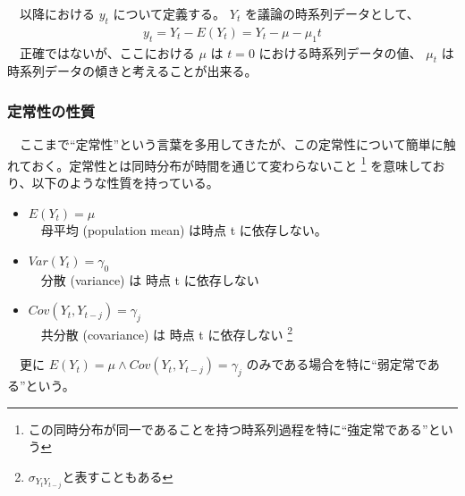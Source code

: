 \documentclass{scrartcl}
\begin{document}
　以降における \(y_t\) について定義する。 \(Y_t\) を議論の時系列データとして、\\
\begin{align}
y_t = Y_t - E(Y_t) = Y_t - \mu - \mu_1 t
\end{align}
　正確ではないが、ここにおける \(\mu\) は \(t = 0\) における時系列データの値、 \(\mu_t\) は 時系列データの傾きと考えることが出来る。\\

\subsubsection{定常性の性質}
\label{sec:org434eb10}
　ここまで``定常性''という言葉を多用してきたが、この定常性について簡単に触れておく。定常性とは同時分布が時間を通じて変わらないこと \footnote{この同時分布が同一であることを持つ時系列過程を特に``強定常である''という} を意味しており、以下のような性質を持っている。\\

\begin{itemize}
\item \(E(Y_t) = \mu\) \\
　母平均 (population mean) は時点 t に依存しない。\\
\item \(Var(Y_t) = \gamma_0\) \\
　分散 (variance) は 時点 t に依存しない\\
\item \(Cov(Y_t, Y_{t-j}) = \gamma_j\) \\
　共分散 (covariance) は 時点 t に依存しない \footnote{$\sigma_{Y_t Y_{t-j}}$と表すこともある}
\end{itemize}

　更に \(E(Y_t) = \mu \land Cov(Y_t, Y_{t-j}) = \gamma_j\) のみである場合を特に``弱定常である''という。\\
\end{document}
